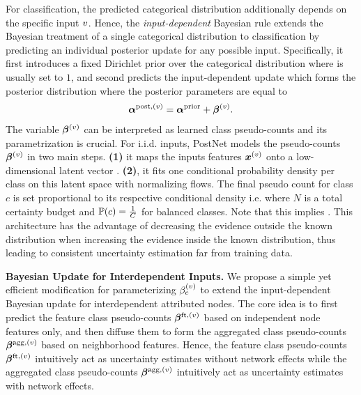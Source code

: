 For classification, the predicted categorical distribution \smash{$\hat{\y} \nodeidxv \sim \DCat(\p\nodeidxv)$} additionally depends on the specific input $v$. Hence, the \emph{input-dependent} Bayesian rule \citep{charpentier2020, NatPN2021} extends the Bayesian treatment of a single categorical distribution to classification by predicting an individual posterior update for any possible input. Specifically, it first introduces a fixed Dirichlet prior over the categorical distribution  where  is usually set to $1$, and second predicts the input-dependent update \smash{$\vbeta\nodeidxv$} which forms the posterior distribution  where the posterior parameters are equal to
\begin{align}\label{eq:input-posterior-update}
    \bm{\alpha}^{\text{post}, (v)} = \bm{\alpha}^\text{prior} + \bm{\beta}^{(v)}.
\end{align}
The variable $\vbeta\nodeidxv$ can be interpreted as learned class pseudo-counts and its parametrization is crucial. For i.i.d. inputs, PostNet \citep{charpentier2020} models the pseudo-counts $\vbeta\nodeidxv$ in two main steps. \textbf{(1)} it maps the inputs features $\bm{x}^{(v)}$ onto a low-dimensional latent vector . \textbf{(2)}, it fits one conditional probability density \smash{$\prob(\z\nodeidxv|\iclass; \vphi)$} per class on this latent space with normalizing flows. The final pseudo count for class $c$ is set proportional to its respective conditional density i.e.  where $N$ is a total certainty budget and $\operatorname{\mathbb{P}}(c)= \frac{1}{C}$ for balanced classes. Note that this implies . This architecture has the advantage of decreasing the evidence outside the known distribution when increasing the evidence inside the known distribution, thus leading to consistent uncertainty estimation far from training data.

\textbf{Bayesian Update for Interdependent Inputs.} We propose a simple yet efficient modification for parameterizing $\beta_c^{(v)}$ to extend the input-dependent Bayesian update for interdependent attributed nodes. The core idea is to first predict the feature class pseudo-counts $\bm{\beta}^{\text{ft}, (v)}$ based on independent node features only, and then diffuse them to form the aggregated class pseudo-counts $\bm{\beta}^{\text{agg}, (v)}$ based on neighborhood features. Hence, the feature class pseudo-counts $\bm{\beta}^{\text{ft}, (v)}$ intuitively act as uncertainty estimates without network effects while the aggregated class pseudo-counts $\bm{\beta}^{\text{agg}, (v)}$ intuitively act as uncertainty estimates with network effects. 


